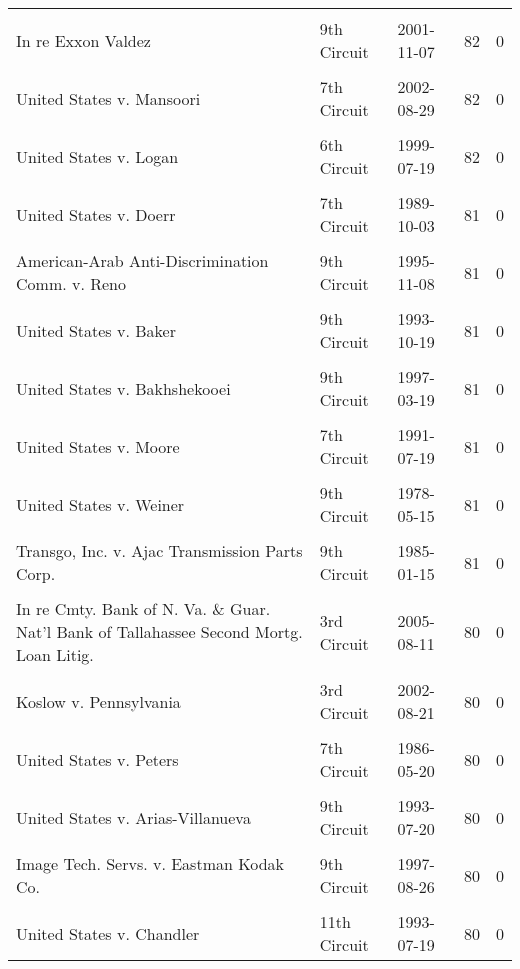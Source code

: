 \documentclass[10pt, letterpaper]{article}
\begin{document}
\begin{spacing}{1.0}
\begin{footnotesize}
\begin{longtable}[H]{p{3.5in}llrr}
& & & &\\[-6pt]
In re Exxon Valdez & 9th Circuit & 2001-11-07 & 82 & 0\\
& & & &\\[-6pt]
United States v. Mansoori & 7th Circuit & 2002-08-29 & 82 & 0\\
& & & &\\[-6pt]
United States v. Logan & 6th Circuit & 1999-07-19 & 82 & 0\\
& & & &\\[-6pt]
United States v. Doerr & 7th Circuit & 1989-10-03 & 81 & 0\\
& & & &\\[-6pt]
American-Arab Anti-Discrimination Comm. v. Reno & 9th Circuit & 1995-11-08 & 81 & 0\\
& & & &\\[-6pt]
United States v. Baker & 9th Circuit & 1993-10-19 & 81 & 0\\
& & & &\\[-6pt]
United States v. Bakhshekooei & 9th Circuit & 1997-03-19 & 81 & 0\\
& & & &\\[-6pt]
United States v. Moore & 7th Circuit & 1991-07-19 & 81 & 0\\
& & & &\\[-6pt]
United States v. Weiner & 9th Circuit & 1978-05-15 & 81 & 0\\
& & & &\\[-6pt]
Transgo, Inc. v. Ajac Transmission Parts Corp. & 9th Circuit & 1985-01-15 & 81 & 0\\
& & & &\\[-6pt]
In re Cmty. Bank of N. Va. \& Guar. Nat'l Bank of Tallahassee Second Mortg. Loan Litig. & 3rd Circuit & 2005-08-11 & 80 & 0\\
& & & &\\[-6pt]
Koslow v. Pennsylvania & 3rd Circuit & 2002-08-21 & 80 & 0\\
& & & &\\[-6pt]
United States v. Peters & 7th Circuit & 1986-05-20 & 80 & 0\\
& & & &\\[-6pt]
United States v. Arias-Villanueva & 9th Circuit & 1993-07-20 & 80 & 0\\
& & & &\\[-6pt]
Image Tech. Servs. v. Eastman Kodak Co. & 9th Circuit & 1997-08-26 & 80 & 0\\
& & & &\\[-6pt]
United States v. Chandler & 11th Circuit & 1993-07-19 & 80 & 0\\

\end{longtable}
\end{footnotesize}
\end{spacing}
\end{document}
